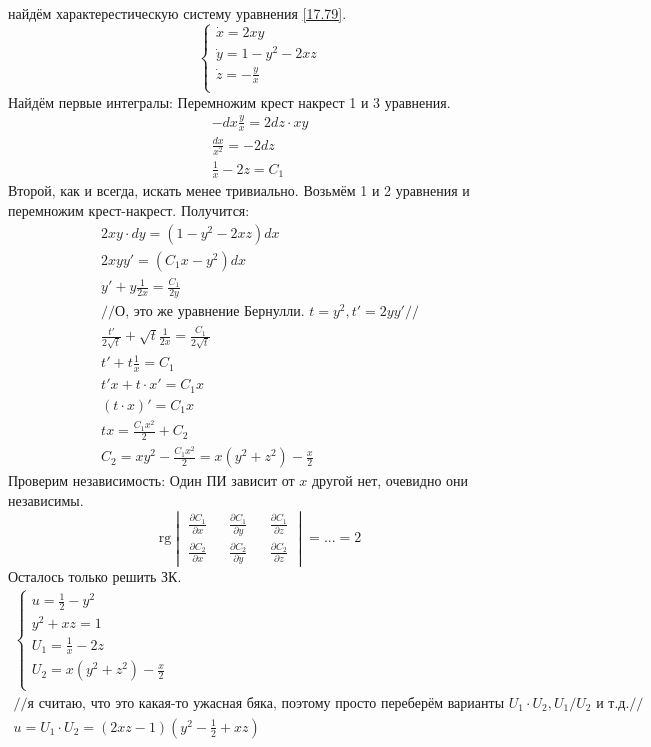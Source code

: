 \documentclass{article}
\newcommand{\rg}{\text{rg}}
\begin{document}
найдём характерестическую систему уравнения \ref{17.79}.
\begin{equation*}
    \begin{cases}
        \dot x = 2xy\\
        \dot y = 1-y^{2}-2 x z\\
        \dot z = -\frac{y}{x} \\
    \end{cases}
\end{equation*}
Найдём первые интегралы:
Перемножим крест накрест 1 и 3 уравнения. 
\begin{gather*}
    -dx \frac{y}{x}=2dz \cdot xy\\
    \frac{dx}{x^2}=-2 dz\\
    \frac{1}{x} - 2z = C_1
\end{gather*}
Второй, как и всегда, искать менее тривиально.
Возьмём 1 и 2 уравнения и перемножим крест-накрест. Получится:
\begin{gather*}
    2xy \cdot dy = (1-y^2-2xz) dx\\
    2xy y'=(C_1x-y^2)dx\\
    y'+y \frac{1}{2x}= \frac{C_1}{2y}\\
    //\text{О, это же уравнение Бернулли. } t=y^2,t'=2y y'  //\\
    \frac{t'}{2 \sqrt t}+\sqrt t \frac{1}{2x} = \frac{C_1}{2 \sqrt t}\\
    t'+t \frac{1}{x}= C_1\\
    t'x+t \cdot x' = C_1 x\\
    (t\cdot x)'=C_1x\\
    t x = \frac{C_1 x^2}{2} + C_2\\
    C_2 = xy^2- \frac{C_1 x^2}{2}= x(y^2+z^2)-\frac{x}{2}
\end{gather*}
Проверим независимость: Один ПИ зависит от $x$ другой нет, очевидно они независимы.
\begin{equation*}
    \rg \begin{vmatrix}
        \frac{\partial C_1}{\partial x} && \frac{\partial C_1}{\partial y} && \frac{\partial C_1}{\partial z}\\
        \frac{\partial C_2}{\partial x} && \frac{\partial C_2}{\partial y} && \frac{\partial C_2}{\partial z}
    \end{vmatrix} = ... = 2
\end{equation*}
Осталось только решить ЗК.
\begin{gather*}
\begin{cases}
        u= \frac{1}{2} - y^2\\
        y^2+xz=1\\
        U_1=\frac{1}{x} - 2z\\
        U_2= x(y^2+z^2)-\frac{x}{2}\\
    \end{cases} \\
    //\text{я считаю, что это какая-то ужасная бяка, поэтому просто переберём варианты } U_1 \cdot U_2, U_1/U_2 \text{ и т.д.}//\\
    u=U_1 \cdot U_2 = (2 x z-1)\left(y^{2}-\frac{1}{2}+x z\right)
\end{gather*}
\end{document}
